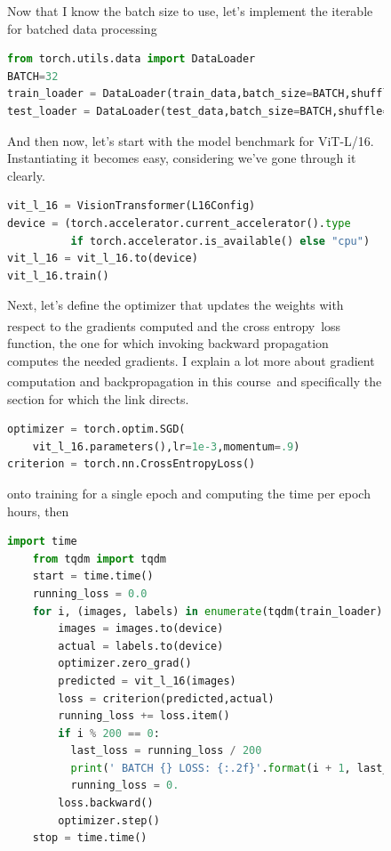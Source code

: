 \documentclass[12pt]{article}
\newcommand{\sidecite}[1]{\textsuperscript{\textcolor{blue}{\textbf{\scriptsize#1}}}}
\newcommand{\maincitecount}{\sidecite{\stepcounter{maincite}\themaincite}}
\begin{document}
\begin{figure}[!htb]
    \begin{minipage}[t]{0.65\textwidth}
    Now that I know the batch size to use, let's implement the iterable for batched data 
    processing 
\begin{lstlisting}[language=python,style=python,basicstyle=\ttfamily\scriptsize]
from torch.utils.data import DataLoader
BATCH=32
train_loader = DataLoader(train_data,batch_size=BATCH,shuffle=True)
test_loader = DataLoader(test_data,batch_size=BATCH,shuffle=True)
\end{lstlisting}
And then now, let's start with the model benchmark for {ViT-L/16}. Instantiating it becomes 
easy, considering we've gone through it clearly.
\begin{lstlisting}[language=python,style=python,basicstyle=\ttfamily\scriptsize]
vit_l_16 = VisionTransformer(L16Config)
device = (torch.accelerator.current_accelerator().type 
          if torch.accelerator.is_available() else "cpu")
vit_l_16 = vit_l_16.to(device)
vit_l_16.train()
\end{lstlisting}
Next, let's define the optimizer that updates the weights with respect to the gradients computed and 
the cross entropy\maincitecount\ loss function, the one for which invoking backward propagation 
computes the needed gradients. I explain a lot more about gradient computation and backpropagation in 
this course\maincitecount\ and specifically the section for which the link directs. 
\begin{lstlisting}[language=python,style=python,basicstyle=\ttfamily\scriptsize]
optimizer = torch.optim.SGD(
    vit_l_16.parameters(),lr=1e-3,momentum=.9)
criterion = torch.nn.CrossEntropyLoss()    
\end{lstlisting}
onto training for a single epoch and computing the time per epoch hours, then
\begin{lstlisting}[language=python,style=python,basicstyle=\ttfamily\scriptsize]
    import time
    from tqdm import tqdm 
    start = time.time()
    running_loss = 0.0
    for i, (images, labels) in enumerate(tqdm(train_loader)):
        images = images.to(device)
        actual = labels.to(device)
        optimizer.zero_grad()
        predicted = vit_l_16(images)
        loss = criterion(predicted,actual)
        running_loss += loss.item()
        if i % 200 == 0:
          last_loss = running_loss / 200
          print(' BATCH {} LOSS: {:.2f}'.format(i + 1, last_loss))
          running_loss = 0.
        loss.backward()
        optimizer.step()
    stop = time.time()

\end{lstlisting}
\end{minipage}
\end{figure}
\end{document}
